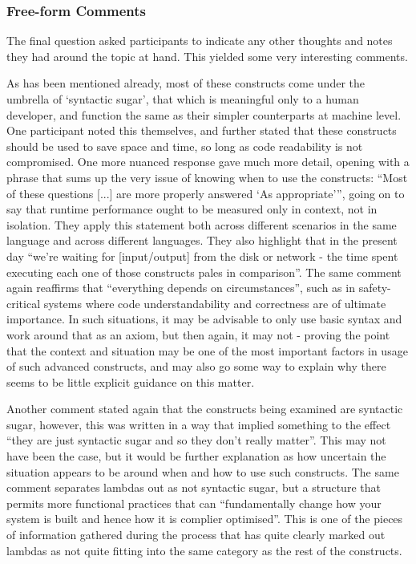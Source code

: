 \documentclass{article}
\begin{document}
        \subsubsection{Free-form Comments}
            The final question asked participants to indicate any other thoughts and notes they had around the topic at hand. This yielded some very interesting comments.

            As has been mentioned already, most of these constructs come under the umbrella of `syntactic sugar', that which is meaningful only to a human developer, and function the same as their simpler counterparts at machine level. One participant noted this themselves, and further stated that these constructs should be used to save space and time, so long as code readability is not compromised. One more nuanced response gave much more detail, opening with a phrase that sums up the very issue of knowing when to use the constructs: ``Most of these questions [...] are more properly answered `As appropriate''', going on to say that runtime performance ought to be measured only in context, not in isolation. They apply this statement both across different scenarios in the same language and across different languages. They also highlight that in the present day ``we're waiting for [input/output] from the disk or network - the time spent executing each one of those constructs pales in comparison''. The same comment again reaffirms that ``everything depends on circumstances'', such as in safety-critical systems where code understandability and correctness are of ultimate importance. In such situations, it may be advisable to only use basic syntax and work around that as an axiom, but then again, it may not - proving the point that the context and situation may be one of the most important factors in usage of such advanced constructs, and may also go some way to explain why there seems to be little explicit guidance on this matter.

            Another comment stated again that the constructs being examined are syntactic sugar, however, this was written in a way that implied something to the effect ``they are just syntactic sugar and so they don't really matter''. This may not have been the case, but it would be further explanation as how uncertain the situation appears to be around when and how to use such constructs. The same comment separates lambdas out as not syntactic sugar, but a structure that permits more functional practices that can ``fundamentally change how your system is built and hence how it is complier optimised''. This is one of the pieces of information gathered during the process that has quite clearly marked out lambdas as not quite fitting into the same category as the rest of the constructs.
\end{document}
